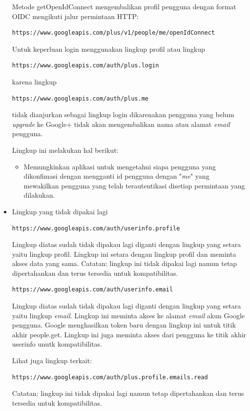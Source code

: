 \begin{itemize}
Metode getOpenIdConnect mengembalikan profil pengguna dengan format OIDC mengikuti jalur permintaan HTTP:
\begin{lstlisting}[basicstyle=\footnotesize]
https://www.googleapis.com/plus/v1/people/me/openIdConnect
\end{lstlisting}

Untuk keperluan login menggunakan lingkup profil atau lingkup
\begin{lstlisting}[basicstyle=\footnotesize]
https://www.googleapis.com/auth/plus.login
\end{lstlisting}
karena lingkup
\begin{lstlisting}[basicstyle=\footnotesize]
https://www.googleapis.com/auth/plus.me
\end{lstlisting}
tidak dianjurkan sebagai lingkup login dikarenakan pengguna yang belum {\it upgrade} ke Google+ tidak akan mengembalikan nama atau alamat {\it email}
pengguna.

Lingkup ini melakukan hal berikut:
\begin{itemize}
\item
Memungkinkan aplikasi untuk mengetahui siapa pengguna yang dikonfimasi dengan mengganti id pengguna dengan "{\it me}" yang mewakilkan pengguna yang telah terautentikasi disetiap permintaan yang dilakukan.
\end{itemize}

\item Lingkup yang tidak dipakai lagi\\
\begin{lstlisting}[basicstyle=\footnotesize]
https://www.googleapis.com/auth/userinfo.profile
\end{lstlisting}

Lingkup diatas sudah tidak dipakau lagi diganti dengan lingkup yang setara yaitu lingkup profil. Lingkup ini setara dengan lingkup profil dan meminta akses data yang sama. Catatan: lingkup ini tidak dipakai lagi namun tetap dipertahankan dan terus tersedia untuk kompatibilitas.

\begin{lstlisting}[basicstyle=\footnotesize]
https://www.googleapis.com/auth/userinfo.email
\end{lstlisting}

Lingkup diatas sudah tidak dipakau lagi diganti dengan lingkup yang setara yaitu lingkup {\it email}. Lingkup ini meminta akses ke alamat {\it email} akun Google pengguna. Google menghasilkan token baru dengan lingkup ini untuk titik akhir people.get. Lingkup ini juga meminta akses dari pengguna ke titik akhir userinfo unutk kompatibilitas.

Lihat juga lingkup terkait:
\begin{lstlisting}[basicstyle=\footnotesize]
https://www.googleapis.com/auth/plus.profile.emails.read
\end{lstlisting}
Catatan: lingkup ini tidak dipakai lagi namun tetap dipertahankan dan terus tersedia untuk kompatibilitas.
\end{itemize}


